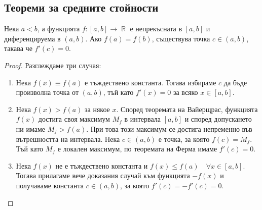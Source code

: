 \documentclass{../../common/topic}
\begin{document}
\subsection{Теореми за средните стойности}

\begin{theorem}[Рол]
  Нека \( a < b \), а функцията \( f: [a, b] \to \BbbR \) е непрекъсната в \( [a, b] \) и диференцируема в \( (a, b) \). Ако \( f(a) = f(b) \), съществува точка \( c \in (a, b) \), такава че \( f'(c) = 0 \).
\end{theorem}
\begin{proof}
  Разглеждаме три случая:
  \begin{enumerate}
    \item Нека \( f(x) \equiv f(a) \) е тъждествено константа. Тогава избираме \( c \) да бъде произволна точка от \( (a, b) \), тъй като \( f'(x) = 0 \) за всяко \( x \in [a, b] \).
    \item Нека \( f(x) > f(a) \) за някое \( x \). Според теоремата на Вайерщрас, функцията \( f(x) \) достига своя максимум \( M_f \) в интервала \( [a, b] \) и според допускането ни имаме \( M_f > f(a) \). При това този максимум се достига непременно във вътрешността на интервала. Нека \( c \in (a, b) \) е точка, за която \( f(c) = M_f \). Тъй като \( M_f \) е локален максимум, по теоремата на Ферма имаме \( f'(c) = 0 \).
    \item Нека \( f(x) \) не е тъждествено константа и \( f(x) \leq f(a)\quad\forall x \in [a, b] \). Тогава прилагаме вече доказания случай към функцията \( -f(x) \) и получаваме константа \( c \in (a, b) \), за която \( f'(c) = -f'(c) = 0 \).
  \end{enumerate}
\end{proof}
\end{document}
